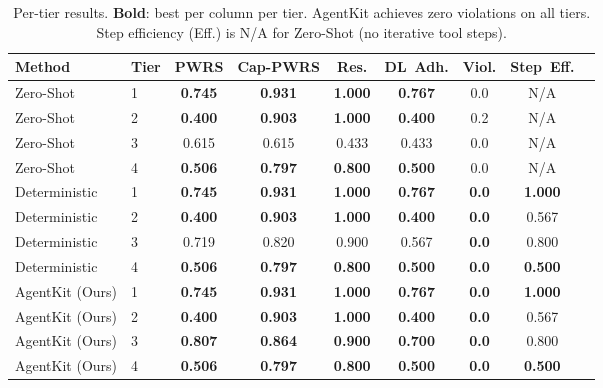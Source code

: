 \documentclass{article}
\begin{document}
\begin{table}[t]
\centering
\caption{Per-tier results. \textbf{Bold}: best per column per tier.
  AgentKit achieves zero violations on all tiers.
  Step efficiency (Eff.) is N/A for Zero-Shot (no iterative tool steps).}
\label{tab:main}
\footnotesize
\renewcommand{\arraystretch}{1.05}
\begin{tabular}{llccccccc}
\toprule
\textbf{Method} & \textbf{Tier} &
  \textbf{PWRS} & \textbf{Cap-PWRS} &
  \textbf{Res.} & \textbf{DL~Adh.} &
  \textbf{Viol.} & \textbf{Step~Eff.} \\
\midrule
Zero-Shot       & 1 & \textbf{0.745} & \textbf{0.931} & \textbf{1.000} & \textbf{0.767} & 0.0 & N/A \\
Zero-Shot       & 2 & \textbf{0.400} & \textbf{0.903} & \textbf{1.000} & \textbf{0.400} & 0.2 & N/A \\
Zero-Shot       & 3 & 0.615          & 0.615          & 0.433          & 0.433          & 0.0 & N/A \\
Zero-Shot       & 4 & \textbf{0.506} & \textbf{0.797} & \textbf{0.800} & \textbf{0.500} & 0.0 & N/A \\
\midrule
Deterministic   & 1 & \textbf{0.745} & \textbf{0.931} & \textbf{1.000} & \textbf{0.767} & \textbf{0.0} & \textbf{1.000} \\
Deterministic   & 2 & \textbf{0.400} & \textbf{0.903} & \textbf{1.000} & \textbf{0.400} & \textbf{0.0} & 0.567 \\
Deterministic   & 3 & 0.719          & 0.820          & 0.900          & 0.567          & \textbf{0.0} & 0.800 \\
Deterministic   & 4 & \textbf{0.506} & \textbf{0.797} & \textbf{0.800} & \textbf{0.500} & \textbf{0.0} & \textbf{0.500} \\
\midrule
AgentKit (Ours) & 1 & \textbf{0.745} & \textbf{0.931} & \textbf{1.000} & \textbf{0.767} & \textbf{0.0} & \textbf{1.000} \\
AgentKit (Ours) & 2 & \textbf{0.400} & \textbf{0.903} & \textbf{1.000} & \textbf{0.400} & \textbf{0.0} & 0.567 \\
AgentKit (Ours) & 3 & \textbf{0.807} & \textbf{0.864} & \textbf{0.900} & \textbf{0.700} & \textbf{0.0} & 0.800 \\
AgentKit (Ours) & 4 & \textbf{0.506} & \textbf{0.797} & \textbf{0.800} & \textbf{0.500} & \textbf{0.0} & \textbf{0.500} \\
\bottomrule
\end{tabular}
\end{table}
\end{document}
